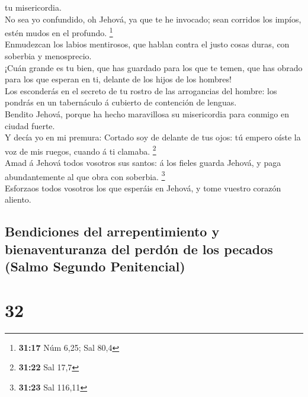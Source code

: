 tu misericordia.\\
 No sea yo confundido, oh Jehová, ya que te he invocado;
sean corridos los impíos, estén mudos en el profundo. \footnote{\textbf{31:17}
  Núm 6,25; Sal 80,4}\\
 Enmudezcan los labios mentirosos, que hablan contra el
justo cosas duras, con soberbia y menosprecio.\\
 ¡Cuán grande es tu bien, que has guardado para los que
te temen, que has obrado para los que esperan en ti, delante de los
hijos de los hombres!\\
 Los esconderás en el secreto de tu rostro de las
arrogancias del hombre: los pondrás en un tabernáculo á cubierto de
contención de lenguas.\\
 Bendito Jehová, porque ha hecho maravillosa su
misericordia para conmigo en ciudad fuerte.\\
 Y decía yo en mi premura: Cortado soy de delante de tus
ojos: tú empero oíste la voz de mis ruegos, cuando á ti clamaba.
\footnote{\textbf{31:22} Sal 17,7}\\
 Amad á Jehová todos vosotros sus santos: á los fieles
guarda Jehová, y paga abundantemente al que obra con soberbia.
\footnote{\textbf{31:23} Sal 116,11}\\
 Esforzaos todos vosotros los que esperáis en Jehová, y
tome vuestro corazón aliento.

\hypertarget{bendiciones-del-arrepentimiento-y-bienaventuranza-del-perduxf3n-de-los-pecados-salmo-segundo-penitencial}{%
\subsection{Bendiciones del arrepentimiento y bienaventuranza del perdón
de los pecados (Salmo Segundo
Penitencial)}\label{bendiciones-del-arrepentimiento-y-bienaventuranza-del-perduxf3n-de-los-pecados-salmo-segundo-penitencial}}

\hypertarget{section-31}{%
\section{32}\label{section-31}}

